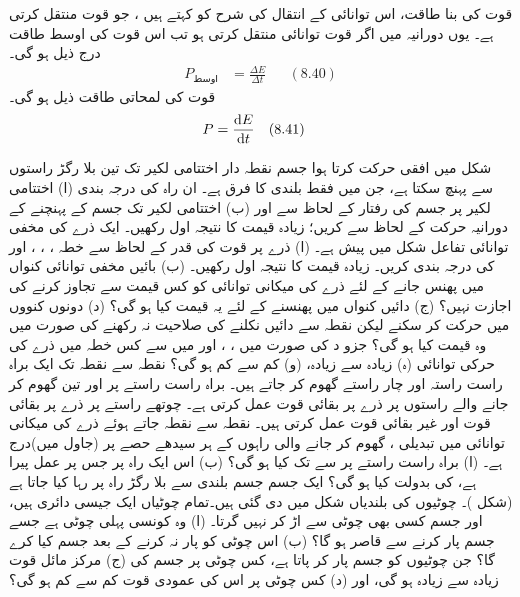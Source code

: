 قوت کی بنا طاقت،    اس  توانائی کے انتقال کی شرح کو کہتے ہیں ، جو قوت منتقل کرتی ہے۔ یوں  دورانیہ میں اگر قوت  توانائی   منتقل کرتی ہو تب اس قوت کی  اوسط  طاقت  درج ذیل ہو گی۔
\begin{align*}
P_{\text{اوسط}}&=\frac{\Delta E}{\Delta t} &&(8.40)
\end{align*}
قوت کی لمحاتی طاقت  ذیل ہو گی۔
\begin{align*}
P&=\frac{\dif E}{\dif t} &&(8.41)
\end{align*}

شکل  میں  افقی حرکت کرتا ہوا   جسم  نقطہ دار اختتامی لکیر تک تین بلا رگڑ راستوں سے پہنچ سکتا ہے، جن میں فقط بلندی کا فرق ہے۔ ان راہ کی درجہ بندی (ا) اختتامی لکیر پر جسم کی  رفتار کے لحاظ سے  اور (ب) اختتامی لکیر تک جسم کے  پہنچنے کے دورانیہ حرکت کے لحاظ سے کریں؛ زیادہ قیمت  کا نتیجہ  اول رکھیں۔
ایک ذرے کی مخفی توانائی تفاعل شکل  میں پیش ہے۔ (ا)  ذرے پر قوت کی قدر کے لحاظ سے خطہ ، ، ، اور  کی درجہ بندی کریں۔ زیادہ قیمت  کا نتیجہ  اول رکھیں۔ (ب)  بائیں مخفی توانائی کنواں  میں  پھنس جانے  کے لئے ذرے کی میکانی توانائی   کو کس  قیمت  سے تجاوز  کرنے کی اجازت نہیں؟ (ج) دائیں کنواں میں پھنسنے کے لئے یہ قیمت کیا ہو گی؟ (د) دونوں کنووں میں حرکت کر سکنے لیکن نقطہ  سے دائیں نکلنے کی صلاحیت نہ رکھنے کی صورت میں وہ قیمت کیا ہو گی؟ جزو  د کی صورت میں  ، ، اور  میں سے کس خطہ  میں  ذرے کی  حرکی توانائی (ہ) زیادہ سے زیادہ، (و) کم سے کم ہو گی؟  
نقطہ  سے نقطہ  تک ایک  براہ راست  راستہ اور چار  راستے گھوم کر جاتے  ہیں۔ براہ راست راستے پر اور تین  گھوم کر جانے  والے راستوں پر  ذرے پر  بقائی قوت  عمل کرتی ہے۔ چوتھے راستے پر  ذرے پر بقائی قوت  اور غیر بقائی قوت   عمل کرتی ہیں۔ نقطہ  سے نقطہ    جاتے ہوئے ذرے کی  میکانی توانائی میں  تبدیلی   ، گھوم کر جانے والی راہوں کے ہر  سیدھے حصے پر     (جاول میں)درج  ہے۔ (ا)  براہ راست راستے پر  سے   تک  کیا ہو گی؟ (ب) اس ایک راہ پر جس پر  عمل پیرا ہے،     کی بدولت  کیا ہو گی؟
ایک جسم جسم       بلندی سے   بلا رگڑ راہ پر   رہا کیا جاتا ہے (شکل )۔  چوٹیوں کی بلندیاں شکل میں  دی گئی ہیں۔تمام چوٹیاں  ایک جیسی دائری ہیں، اور جسم کسی بھی چوٹی سے اڑ کر نہیں  گرتا۔ (ا)  وہ  کونسی  پہلی چوٹی ہے جسے جسم پار کرنے سے قاصر ہو گا؟  (ب)  اس چوٹی کو پار نہ کرنے کے بعد جسم کیا کرے گا؟ جن چوٹیوں کو جسم پار کر پاتا ہے،  کس چوٹی پر جسم کی  (ج) مرکز مائل قوت  زیادہ سے زیادہ ہو گی، اور (د) کس چوٹی پر اس کی عمودی قوت کم سے کم ہو گی؟
